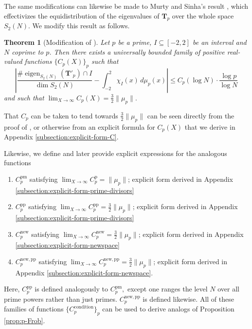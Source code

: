 \documentclass[11pt,letterpaper,reqno]{amsart}
\newtheorem{theorem}{Theorem}[section]
\theoremstyle{definition}
\numberwithin{equation}{section}
\numberwithin{figure}{section}
\numberwithin{table}{section}
\newcommand{\nw}{\mathrm{new}}
\begin{document}
The same modifications can likewise be made to Murty and Sinha's result \cite[Theorem 2]{MS07}, which effectivizes the equidistribution of the eigenvalues of $\mathbf{T}_p$ over the whole space $S_2(N).$ We modify this result as follows.

\begin{theorem}[{Modification of \cite[Theorem 2]{MS07}}]
Let $p$ be a prime, $I\subseteq [-2,2]$ be an interval and $N$ coprime to $p$. Then there exists a universally bounded family of positive real-valued functions $\{C_p(X)\}_p$ such that
\[
\left|
\frac{\# \operatorname{eigen}_{S_2(N)}(\mathbf{T}'_p) \cap I}
{\dim S_2(N)}
-
\int_{-2}^2 \chi_I(x)\, d\mu_p(x)
\right|
\leq C_p(\log N) \cdot \frac{\log p}{\log N}
\]
and such that $\lim_{X \rightarrow \infty } C_p(X) = \frac{3}{2} \| \mu_p \|.$
\end{theorem}

That $C_p$ can be taken to tend towards $\frac{3}{2} \| \mu_p \|$ can be seen directly from the proof of \cite[Theorem 2]{MS07}, or otherwise from an explicit formula for $C_p(X)$ that we derive in Appendix \ref{subsection:explicit-form-C}.

Likewise, we define and later provide explicit expressions for the analogous functions
\begin{enumerate}
    \item $C_p^{\text{pm}}$ satisfying $\lim_{X \rightarrow \infty} C_p^{\text{p}} =  \| \mu_p \|$; explicit form derived in Appendix \ref{subsection:explicit-form-prime-divisors}
    \item $C_p^{\text{pp}}$ satisfying $\lim_{X \rightarrow \infty} C_p^{\text{pp}} =  \frac{3}{2}\| \mu_p \|$; explicit form derived in Appendix \ref{subsection:explicit-form-prime-divisors}
    \item $C_p^{\nw}$ satisfying $\lim_{X \rightarrow \infty} C_p^{\nw} = \frac{3}{2} \| \mu_p \|$; explicit form derived in Appendix \ref{subsection:explicit-form-newspace}
    \item $C_p^{\nw, \text{pp}}$ satisfying $\lim_{X \rightarrow \infty} C_p^{\nw, \text{pp}} =  \frac{3}{2}\| \mu_p \|$; explicit form derived in Appendix \ref{subsection:explicit-form-newspace}.
\end{enumerate}
Here, $C_p^{\text{pp}}$ is defined analogously to $C_p^{\text{pm}},$ except one ranges the level $N$ over all prime powers rather than just primes. $C_p^{\nw, \text{pp}}$ is defined likewise. All of these families of functions $\{C_p^{\text{condition}}\}_p$ can be used to derive analogs of Proposition \ref{prop:p-Frob}.
\end{document}
